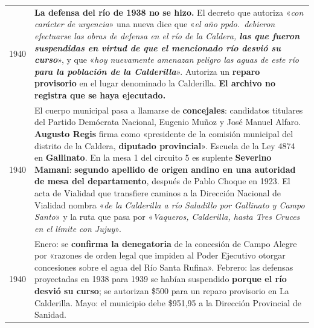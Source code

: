 \begin{longtable}{@{}p{2.7cm}p{10.3cm}@{}}
1940 & \textbf{La defensa del río de 1938 no se hizo.} El decreto que autoriza «\textit{con carácter de urgencia}» una nueva dice que «\textit{el año ppdo.\ debieron efectuarse las obras de defensa en el río de la Caldera, \textbf{las que fueron suspendidas en virtud de que el mencionado río desvió su curso}}», y que «\textit{hoy nuevamente amenazan peligro las aguas de este río \textbf{para la población de la Calderilla}}». Autoriza un \textbf{reparo provisorio} en el lugar denominado la Calderilla. \textbf{El archivo no registra que se haya ejecutado.} \\
1940 & El cuerpo municipal pasa a llamarse de \textbf{concejales}: candidatos titulares del Partido Demócrata Nacional, Eugenio Muñoz y José Manuel Alfaro. \textbf{Augusto Regis}\index{Regis, Augusto} firma como «presidente de la comisión municipal del distrito de la Caldera, \textbf{diputado provincial}». Escuela de la Ley 4874 en \textbf{Gallinato}. En la mesa 1 del circuito 5 es suplente \textbf{Severino Mamani}: \textbf{segundo apellido de origen andino en una autoridad de mesa del departamento}, después de Pablo Choque en 1923. El acta de Vialidad que transfiere caminos a la Dirección Nacional de Vialidad nombra «\textit{de la Calderilla a río Saladillo por Gallinato y Campo Santo}» y la ruta que pasa por «\textit{Vaqueros, Calderilla, hasta Tres Cruces en el límite con Jujuy}». \\
1940 & Enero: se \textbf{confirma la denegatoria} de la concesión de Campo Alegre por «razones de orden legal que impiden al Poder Ejecutivo otorgar concesiones sobre el agua del Río Santa Rufina». Febrero: las defensas proyectadas en 1938 para 1939 se habían suspendido \textbf{porque el río desvió su curso}; se autorizan \$500 para un reparo provisorio en La Calderilla. Mayo: el municipio debe \$951,95 a la Dirección Provincial de Sanidad. \\

\end{longtable}
